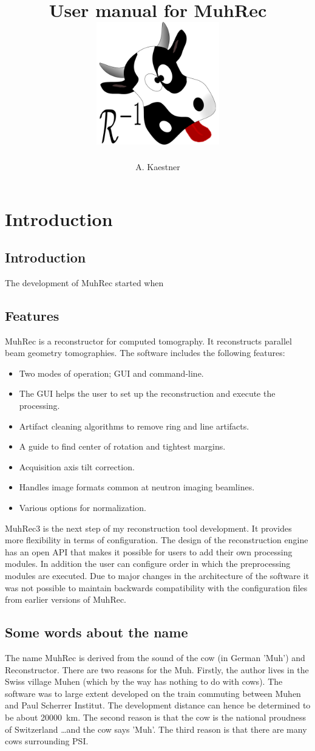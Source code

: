 \documentclass[a4paper]{scrreprt}
\title{User manual for MuhRec\\\vskip30pt\includegraphics[width=0.4\textwidth]{figures/muh_icon.pdf}}
\author{A. Kaestner}
\begin{document}
\maketitle
\tableofcontents
\chapter{Introduction}
\section{Introduction}
The development of MuhRec started when
\section{Features}
MuhRec is a reconstructor for computed tomography. It reconstructs parallel beam geometry tomographies.
The software includes the following features:
\begin{itemize}
\item Two modes of operation; GUI and command-line.
\item The GUI helps the user to set up the reconstruction and execute the processing.
\item Artifact cleaning algorithms to remove ring and line artifacts.
\item A guide to find center of rotation and tightest margins.
\item Acquisition axis tilt correction.
\item Handles image formats common at neutron imaging beamlines.
\item Various options for normalization.
\end{itemize}

MuhRec3 is the next step of my reconstruction tool development. It provides more flexibility in terms of configuration. The design of the reconstruction engine has an open API that makes it possible for users to add their own processing modules. In
addition the user can configure order in which the preprocessing modules are
executed. Due to major changes in the architecture of the software it was not
possible to maintain backwards compatibility with the configuration files from
earlier versions of MuhRec.

\section{Some words about the name}
The name MuhRec is derived from the sound of the cow (in German 'Muh') and Reconstructor.
There are two reasons for the Muh. Firstly, the author lives in the Swiss village Muhen
(which by the way has nothing to do with cows). The software was to large extent developed
on the train commuting between Muhen and Paul Scherrer Institut. The development distance
can hence be determined to be about 20000~km. The second reason is that the cow is the
national proudness of Switzerland \ldots and the cow says 'Muh'. The third reason is that there are many cows surrounding PSI.
\end{document}
